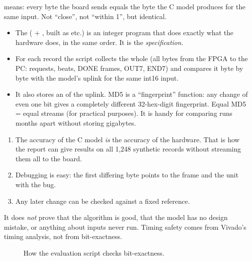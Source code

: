 \documentclass[11pt]{article}
\begin{document}
 means: every byte the board sends equals the byte the C model produces for the same input. Not ``close'', not ``within 1'', but identical.

\begin{itemize}
  \item The  ( + , built as  etc.) is an integer program that does exactly what the hardware does, in the same order. It is the \emph{specification}.
  \item For each record the script collects the whole  (all bytes from the FPGA to the PC: requests, beats, DONE frames, OUT7, END7) and compares it byte by byte with the model's uplink for the same int16 input.
  \item It also stores an  of the uplink. MD5 is a ``fingerprint'' function: any change of even one bit gives a completely different 32-hex-digit fingerprint. Equal MD5 = equal streams (for practical purposes). It is handy for comparing runs months apart without storing gigabytes.
\end{itemize}

\begin{simple}
\begin{enumerate}
  \item The accuracy of the C model \emph{is} the accuracy of the hardware. That is how the report can give results on all 1,248 synthetic records without streaming them all to the board.
  \item Debugging is easy: the first differing byte points to the frame and the unit with the bug.
  \item Any later change can be checked against a fixed reference.
\end{enumerate}
It does \emph{not} prove that the algorithm is good, that the model has no design mistake, or anything about inputs never run. Timing safety comes from Vivado's timing analysis, not from bit-exactness.
\end{simple}

\begin{figure}[H]
\centering
{}
\caption{How the evaluation script checks bit-exactness.}
\end{figure}
\end{document}
